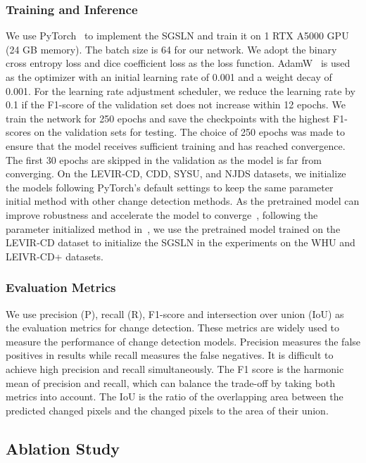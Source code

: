 \documentclass[journal]{IEEEtran}
\begin{document}
\subsubsection{Training and Inference}
\label{section:4.3.2}

We use PyTorch~\cite{pytorch} to implement the SGSLN and train it on 1 RTX A5000 GPU (24 GB memory). The batch size is 64 for our network. We adopt the binary cross entropy loss and dice coefficient loss as the loss function. AdamW~\cite{adam} is used as the optimizer with an initial learning rate of 0.001 and a weight decay of 0.001. For the learning rate adjustment scheduler, we reduce the learning rate by 0.1 if the F1-score of the validation set does not increase within 12 epochs. We train the network for 250 epochs and save the checkpoints with the highest F1-scores on the validation sets for testing. The choice of 250 epochs was made to ensure that the model receives sufficient training and has reached convergence. The first 30 epochs are skipped in the validation as the model is far from converging. On the LEVIR-CD, CDD, SYSU, and NJDS datasets, we initialize the models following PyTorch's default settings to keep the same parameter initial method with other change detection methods. As the pretrained model can improve robustness and accelerate the model to converge~\cite{upt}, following the parameter initialized method in~\cite{fccdn}, we use the pretrained model trained on the LEVIR-CD dataset to initialize the SGSLN in the experiments on the WHU and LEIVR-CD+ datasets.

\subsubsection{Evaluation Metrics}

We use precision (P), recall (R), F1-score and intersection over union (IoU) as the evaluation metrics for change detection. These metrics are widely used to measure the performance of change detection models. Precision measures the false positives in results while recall measures the false negatives. It is difficult
to achieve high precision and recall simultaneously. The F1 score is the harmonic mean of precision and recall, which can balance the trade-off by taking both metrics into account. The IoU is the ratio of the overlapping area between the predicted changed pixels and the changed pixels to the area of their union.


\subsection{Ablation Study}
\label{section:4.4.1}
\end{document}
